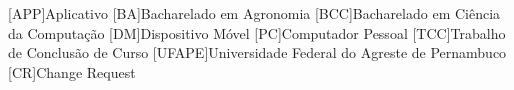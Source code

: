 \begin{acronym}[ACRONYM] 
[APP]{Aplicativo}
[BA]{Bacharelado em Agronomia}
[BCC]{Bacharelado em Ciência da Computação}
[DM]{Dispositivo Móvel}
[PC]{Computador Pessoal}
[TCC]{Trabalho de Conclusão de Curso}
[UFAPE]{Universidade Federal do Agreste de Pernambuco}
[CR]{Change Request}
\end{acronym}